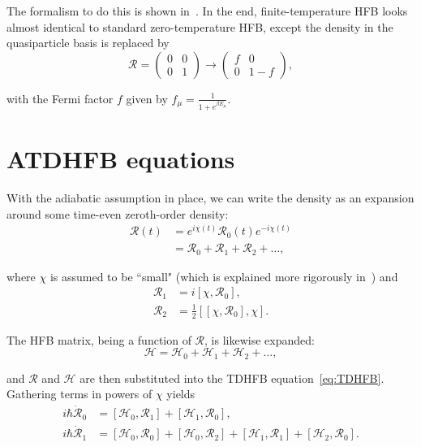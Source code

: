 The formalism to do this is shown in~\cite{Goodman1981}. In the end, finite-temperature HFB looks almost identical to standard zero-temperature HFB, except the density in the quasiparticle basis is replaced by
\begin{equation}
\mathcal{R} =
\left(\begin{array}{cc}
0 & 0 \\
0 & 1
\end{array}\right)
\rightarrow
\left(\begin{array}{cc}
f & 0 \\
0 & 1-f
\end{array}\right),\label{eq:FTdensity}
\end{equation}

\noindent with the Fermi factor $f$ given by $f_\mu=\frac{1}{1+e^{\beta E_\mu}}$.

\section{ATDHFB equations}

With the adiabatic assumption in place, we can write the density as an expansion around some time-even zeroth-order density:
\begin{align}
\mathcal{R}(t) 
&= e^{i\chi(t)}\mathcal{R}_0(t)e^{-i\chi(t)} \\
&= \mathcal{R}_0 + \mathcal{R}_1 + \mathcal{R}_2 + \dots,
\end{align}

\noindent where $\chi$ is assumed to be ``small" (which is explained more rigorously in~\cite{Baranger1978}) and
\begin{align}\label{eqn:densities1}
\mathcal{R}_1 &= i\left[\chi, \mathcal{R}_0\right], \\
\label{eqn:densities2}\mathcal{R}_2 &= \frac{1}{2}\left[\left[\chi, \mathcal{R}_0\right], \chi\right] .
\end{align}

The HFB matrix, being a function of $\mathcal{R}$, is likewise expanded:
\begin{equation}
\mathcal{H} = \mathcal{H}_0 + \mathcal{H}_1 + \mathcal{H}_2 + \dots,
\end{equation}

\noindent and $\mathcal{R}$ and $\mathcal{H}$ are then substituted into the TDHFB equation~\eqref{eq:TDHFB}. Gathering terms in powers of $\chi$ yields
\begin{align}
i\hbar\mathcal{\dot{R}}_0 &= \left[\mathcal{H}_0, \mathcal{R}_1\right] + \left[\mathcal{H}_1, \mathcal{R}_0\right], \label{eq:ATDHFB1}\\
i\hbar\mathcal{\dot{R}}_1 &= \left[\mathcal{H}_0, \mathcal{R}_0\right] + \left[\mathcal{H}_0, \mathcal{R}_2\right]
+ \left[\mathcal{H}_1, \mathcal{R}_1\right] + \left[\mathcal{H}_2, \mathcal{R}_0\right].\label{eq:ATDHFB2}
\end{align}

